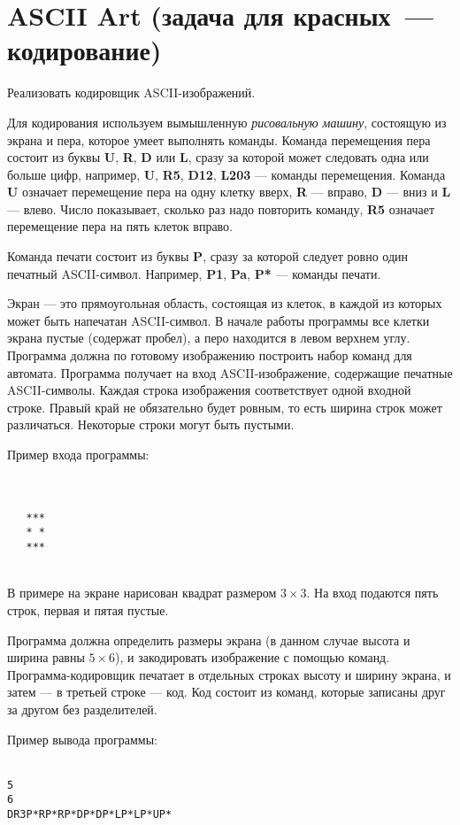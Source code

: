 \documentclass[a4paper,10pt]{article}
\begin{document}
\section*{ASCII Art (задача для красных~--- кодирование)}

Реализовать кодировщик ASCII-изображений.

Для кодирования используем вымышленную {\em рисовальную машину}, состоящую из экрана и пера, которое умеет выполнять команды.
Команда перемещения пера состоит из буквы \textbf{U}, \textbf{R}, \textbf{D} или \textbf{L}, сразу за которой может следовать одна или больше цифр, например, \textbf{U}, \textbf{R5}, \textbf{D12}, \textbf{L203} — команды перемещения.
Команда \textbf{U} означает перемещение пера на одну клетку вверх, \textbf{R} — вправо, \textbf{D} — вниз и \textbf{L} — влево.
Число показывает, сколько раз надо повторить команду, \textbf{R5} означает перемещение пера на пять клеток вправо.

Команда печати состоит из буквы \textbf{P}, сразу за которой следует ровно один печатный ASCII-символ.
Например, \textbf{P1}, \textbf{Pa}, \textbf{P*} — команды печати.

Экран — это прямоугольная область, состоящая из клеток, в каждой из которых может быть напечатан ASCII-символ.
В начале работы программы все клетки экрана пустые (содержат пробел), а перо находится в левом верхнем углу.
Программа должна по готовому изображению построить набор команд для автомата.
Программа получает на вход ASCII-изображение, содержащие печатные ASCII-символы.
Каждая строка изображения соответствует одной входной строке.
Правый край не обязательно будет ровным, то есть ширина строк может различаться.
Некоторые строки могут быть пустыми.

Пример входа программы:

\texttt{ \\
\\
\ \ \ ***\\
\ \ \ *\ *\\
\ \ \ ***\\
\\
}

В примере на экране нарисован квадрат размером $3\times 3$. На вход подаются пять строк, первая и пятая пустые.

Программа должна определить размеры экрана (в данном случае высота и ширина равны $5\times 6$), и закодировать изображение с помощью команд. Программа-кодировщик печатает в отдельных строках высоту и ширину экрана, и затем — в третьей строке — код. Код состоит из команд, которые записаны друг за другом без разделителей.

Пример вывода программы:

\texttt{ \\
5\\
6\\
DR3P*RP*RP*DP*DP*LP*LP*UP*}
\end{document}
